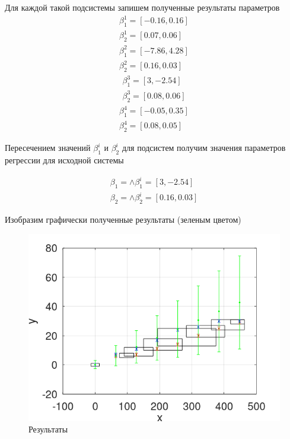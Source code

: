\documentclass[12pt,a4paper]{article}
\begin{document}
        Для каждой такой подсистемы запишем полученные результаты параметров
        \begin{align}
            \beta_{1}^{1} = [-0.16, 0.16]\\
               \beta_{2}^{1} = [0.07, 0.06]
        \end{align}
        \begin{align}
            \beta_{1}^{2} = [-7.86, 4.28]\\
               \beta_{2}^{2} = [0.16, 0.03]
        \end{align}
        \begin{align}
            \beta_{1}^{3} = [3, -2.54]\\
               \beta_{2}^{3} = [0.08, 0.06]
        \end{align}
        \begin{align}
            \beta_{1}^{4} = [-0.05, 0.35]\\
            \beta_{2}^{4} = [0.08, 0.05]
        \end{align}
        
        Пересечением значений $\beta_{1}^{i}$ и $\beta_{2}^{i}$ для подсистем получим значения параметров регрессии для исходной системы
        
        \begin{align*}
            \beta_{1} = \wedge \beta_{1}^{i} = [3, -2.54]\\
            \beta_{2} = \wedge \beta_{2}^{i} = [0.16, 0.03]
        \end{align*}
        
        Изобразим графически полученные результаты (зеленым цветом)
        
        \begin{figure}[H]
            \centering
            \includegraphics[width=14cm]{img/scores.png}
            \caption{Результаты}
            \label{fig:info}
        \end{figure}
        
\end{document}
